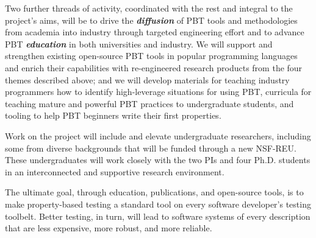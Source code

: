 
Two further threads of activity, coordinated with the rest and integral to the
project's aims, will
%
be to drive the {\bf\em diffusion} of PBT tools and
methodologies from academia into industry through targeted engineering effort
%
and to advance PBT {\bf\em education} in
both universities and industry.  We will support and strengthen existing
open-source PBT tools in popular programming languages and enrich their
capabilities with re-engineered research products from the four themes described
above;
%
and we will
develop materials for teaching industry programmers how to identify
high-leverage situations for using PBT, curricula for teaching mature
and powerful PBT practices to undergraduate students, and tooling to help
PBT beginners write their first properties.
%

Work on the project will include and elevate undergraduate
researchers, including some from diverse backgrounds that will be
funded through a new NSF-REU. These undergraduates will work
closely with the two PIs and four Ph.D.{} students in an interconnected and supportive
research environment.

The ultimate goal, through education, publications, and open-source
tools, is to make property-based testing a standard tool on every
software developer's testing toolbelt.  Better testing, in turn, will
lead to software systems of every description that are less expensive, more
robust, and more reliable.


